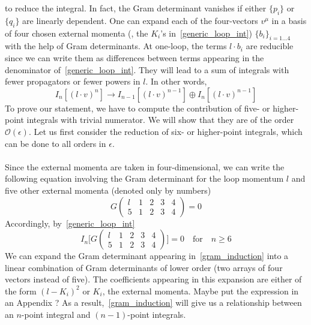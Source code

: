 to reduce the integral.
In fact, the Gram determinant vanishes if either $\{p_i\}$ or $\{q_i\}$ are linearly dependent.
One can expand each of the four-vectors $v^\mu$ in a basis of four chosen external momenta (\ie , the $K_i$'s in~\cref{generic_loop_int}) $\{b_i\}_{i=1\ldots 4}$ with the help of Gram determinants.
At one-loop, the terms $l\cdot b_i$ are reducible since we can write them as differences between terms appearing in the denominator of~\cref{generic_loop_int}.
They will lead to a sum of integrals with fewer propagators or fewer powers in $l$. 
In other words, 
\begin{equation}
I_n[(l\cdot v)^n] \rightarrow I_{n-1}[(l\cdot v)^{n-1}]\oplus I_n[(l\cdot v)^{n-1}]
\end{equation}
To prove our statement, we have to compute the contribution of five- or higher-point integrals with trivial numerator. 
We will show that they are of the order $\mathcal{O}(\epsilon)$.
Let us first consider the reduction of six- or higher-point integrals, which can be done to all orders in $\epsilon$. 
\\\\
Since the external momenta are taken in four-dimensional,
we can write the following equation involving the Gram determinant for the loop momentum $l$ and five other external momenta (denoted only by numbers) 
\begin{equation}
G\begin{pmatrix}
l & 1 & 2 & 3 & 4\\
5 & 1 & 2 & 3 & 4 
\end{pmatrix}
 = 0
\end{equation}
Accordingly, by~\cref{generic_loop_int}
\begin{equation}\label{gram_induction}
I_n\Big[G\begin{pmatrix}
l & 1 & 2 & 3 & 4\\
5 & 1 & 2 & 3 & 4 
\end{pmatrix}\Big]
 = 0
 \quad\mathrm{for}\quad n\geq 6
\end{equation}
We can expand the Gram determinant appearing in~\cref{gram_induction} into a linear combination of Gram determinants of lower order (two arrays of four vectors instead of five).
The coefficients appearing in this expansion are either of the form $(l-K_i)^2$ or $K_i$, the external momenta.
\color{red} Maybe put the expression in an Appendix ?\color{black}
As a result,~\cref{gram_induction} will give us a relationship between an $n$-point integral and $(n-1)$-point integrals.
\\\\
